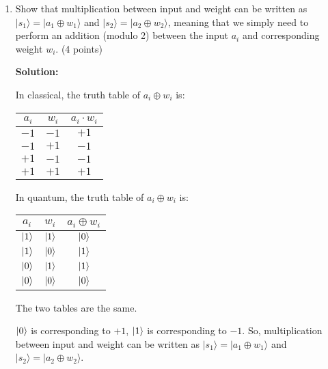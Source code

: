 \documentclass[12pt]{article}
\begin{document}
\begin{enumerate}[start=4]
    \item Show that multiplication between input and weight can be written as $|s_1\rangle = |a_1 \oplus w_1\rangle$ and $|s_2\rangle = |a_2 \oplus w_2\rangle$,
    meaning that we simply need to perform an addition (modulo 2) between the input $a_i$ and corresponding weight
    $w_i$. (4 points)

    \textbf{Solution:}

    In classical, the truth table of $a_i\oplus w_i$ is:
    \begin{table}[h]
        \centering
        \begin{tabular}{|c|c|c|}
            \hline
            $a_i$ & $w_i$ & $a_i\cdot w_i$ \\
            \hline
            $-1$  & $-1$  & $+1$            \\
            \hline
            $-1$  & $+1$  & $-1$            \\
            \hline
            $+1$  & $-1$  & $-1$            \\
            \hline
            $+1$  & $+1$  & $+1$            \\
            \hline
        \end{tabular}
    \end{table}

    In quantum, the truth table of $a_i\oplus w_i$ is:
    \begin{table}[h]
        \centering
        \begin{tabular}{|c|c|c|}
            \hline
            $a_i$       & $w_i$       & $a_i\oplus w_i$ \\
            \hline
            $\ket{1}$ & $\ket{1}$ & $\ket{0}$  \\
            \hline
            $\ket{1}$ & $\ket{0}$ & $\ket{1}$  \\
            \hline
            $\ket{0}$ & $\ket{1}$ & $\ket{1}$  \\
            \hline
            $\ket{0}$ & $\ket{0}$ & $\ket{0}$  \\
            \hline
        \end{tabular}
    \end{table}

    The two tables are the same.

    $\ket{0}$ is corresponding to $+1$, $\ket{1}$ is corresponding to $-1$.
    So, multiplication between input and weight can be written as $|s_1\rangle = |a_1 \oplus w_1\rangle$ and $|s_2\rangle = |a_2 \oplus w_2\rangle$.
    
\end{enumerate}
\end{document}
